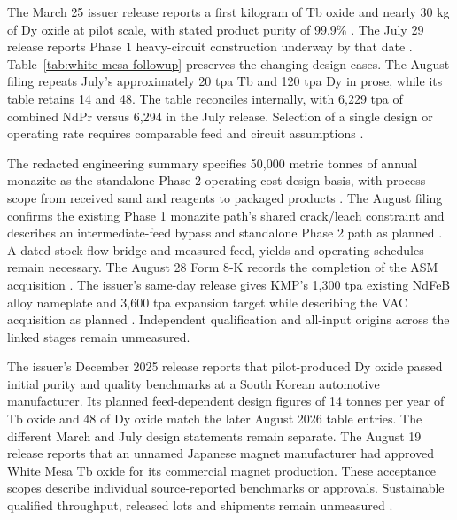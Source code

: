 \documentclass[11pt]{article}
\begin{document}
The March 25 issuer release reports a first kilogram of Tb oxide and nearly 30 kg of Dy oxide at pilot scale, with stated product purity of 99.9\% \citep{EFHeavyPilot2026}. The July 29 release reports Phase 1 heavy-circuit construction underway by that date \citep{EFHeavyConstruction2026}. Table~\ref{tab:white-mesa-followup} preserves the changing design cases. The August filing repeats July's approximately 20 tpa Tb and 120 tpa Dy in prose, while its table retains 14 and 48. The table reconciles internally, with 6,229 tpa of combined NdPr versus 6,294 in the July release. Selection of a single design or operating rate requires comparable feed and circuit assumptions \citep{EFQ22026}.
\begin{table}[htbp]\centering\small

\caption{White Mesa issuer design disclosures in tonnes per annum. The Phase 1 NdPr table figure is labeled existing. Heavy-circuit extensions and combined totals describe proposed capacity. Dashes in the prose rows mark figures outside the comparison.}\label{tab:white-mesa-followup}
\end{table}

The redacted engineering summary specifies 50,000 metric tonnes of annual monazite as the standalone Phase 2 operating-cost design basis, with process scope from received sand and reagents to packaged products \citep{WhiteMesaBFS2026}. The August filing confirms the existing Phase 1 monazite path's shared crack/leach constraint and describes an intermediate-feed bypass and standalone Phase 2 path as planned \citep{EFQ22026}. A dated stock-flow bridge and measured feed, yields and operating schedules remain necessary. The August 28 Form 8-K records the completion of the ASM acquisition \citep{EFASM2026}. The issuer's same-day release gives KMP's 1,300 tpa existing NdFeB alloy nameplate and 3,600 tpa expansion target while describing the VAC acquisition as planned \citep{EFASMIssuer2026}. Independent qualification and all-input origins across the linked stages remain unmeasured.

The issuer's December 2025 release reports that pilot-produced Dy oxide passed initial purity and quality benchmarks at a South Korean automotive manufacturer. Its planned feed-dependent design figures of 14 tonnes per year of Tb oxide and 48 of Dy oxide match the later August 2026 table entries. The different March and July design statements remain separate. The August 19 release reports that an unnamed Japanese magnet manufacturer had approved White Mesa Tb oxide for its commercial magnet production. These acceptance scopes describe individual source-reported benchmarks or approvals. Sustainable qualified throughput, released lots and shipments remain unmeasured \citep{EFWhiteDy2025,EFWhiteTb2026}.
\end{document}
